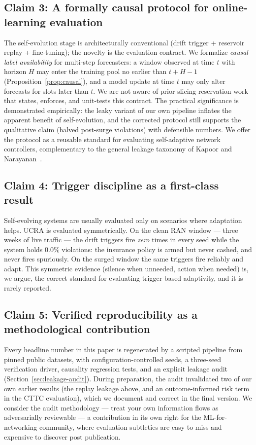 \subsection{Claim 3: A formally causal protocol for online-learning
evaluation}

The self-evolution stage is architecturally conventional (drift
trigger + reservoir replay + fine-tuning); the novelty is the
evaluation contract. We formalize \emph{causal label availability} for
multi-step forecasters: a window observed at time $t$ with horizon
$H$ may enter the training pool no earlier than $t+H-1$
(Proposition~\ref{prop:causal}), and a model update at time $t$ may
only alter forecasts for slots later than $t$. We are not aware of
prior slicing-reservation work that states, enforces, and unit-tests
this contract. The practical significance is demonstrated
empirically: the leaky variant of our own pipeline inflates the
apparent benefit of self-evolution, and the corrected protocol still
supports the qualitative claim (halved post-surge violations) with
defensible numbers. We offer the protocol as a reusable standard for
evaluating self-adaptive network controllers, complementary to the
general leakage taxonomy of Kapoor and Narayanan~\cite{kapoor2023leakage}.

\subsection{Claim 4: Trigger discipline as a first-class result}

Self-evolving systems are usually evaluated only on scenarios where
adaptation helps. UCRA is evaluated symmetrically. On the clean RAN
window --- three weeks of live traffic --- the drift triggers fire
\emph{zero} times in every seed while the system holds 0.0\%
violations: the insurance policy is armed but never cashed, and never
fires spuriously. On the surged window the same triggers fire
reliably and adapt. This symmetric evidence (silence when unneeded,
action when needed) is, we argue, the correct standard for
evaluating trigger-based adaptivity, and it is rarely reported.

\subsection{Claim 5: Verified reproducibility as a methodological
contribution}

Every headline number in this paper is regenerated by a scripted
pipeline from pinned public datasets, with configuration-controlled
seeds, a three-seed verification driver, causality regression tests,
and an explicit leakage audit (Section~\ref{sec:leakage-audit}).
During preparation, the audit invalidated two of our own earlier
results (the replay leakage above, and an outcome-informed risk term
in the CTTC evaluation), which we document and correct in the final
version. We consider the audit methodology --- treat your own
information flows as adversarially reviewable --- a contribution in
its own right for the ML-for-networking community, where evaluation
subtleties are easy to miss and expensive to discover post
publication.

